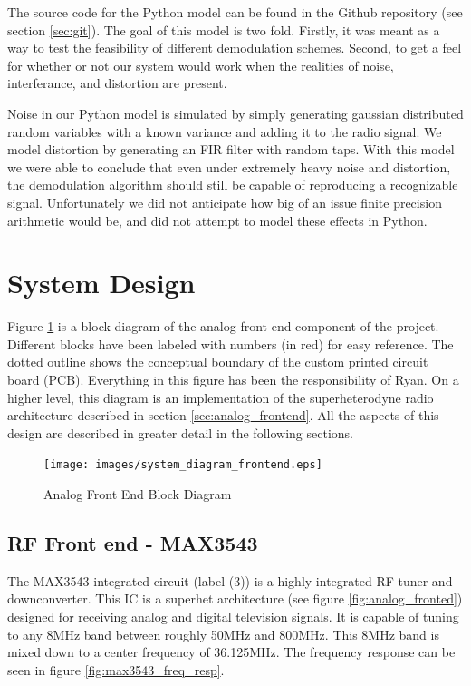 \documentclass[a4paper, 12pt, notitlepage]{article}
\begin{document}
The source code for the Python model can be found in the Github repository (see section \ref{sec:git}).  The goal of this model is two fold.  Firstly, it was meant as a way to test the feasibility of different demodulation schemes.  Second, to get a feel for whether or not our system would work when the realities of noise, interferance, and distortion are present.

Noise in our Python model is simulated by simply generating gaussian distributed random variables with a known variance and adding it to the radio signal.  We model distortion by generating an FIR filter with random taps.  With this model we were able to conclude that even under extremely heavy noise and distortion, the demodulation algorithm should still be capable of reproducing a recognizable signal.  Unfortunately we did not anticipate how big of an issue finite precision arithmetic would be, and did not attempt to model these effects in Python.

\section{System Design}
Figure \ref{fig:analog_block_diagram} is a block diagram of the analog front end component of the project.  Different blocks have been labeled with numbers (in red) for easy reference.  The dotted outline shows the conceptual boundary of the custom printed circuit board (PCB).  Everything in this figure has been the responsibility of Ryan.  On a higher level, this diagram is an implementation of the superheterodyne radio architecture described in section \ref{sec:analog_frontend}.  All the aspects of this design are described in greater detail in the following sections.

\begin{figure}
  \centering
  \caption{Analog Front End Block Diagram}
  \label{fig:analog_block_diagram}
  \texttt{[image: images/system\_diagram\_frontend.eps]}
\end{figure}

\subsection{RF Front end - MAX3543}
The MAX3543 integrated circuit \cite{max3543} (label (3)) is a highly integrated RF tuner and downconverter.  This IC is a superhet architecture (see figure \ref{fig:analog_fronted}) designed for receiving analog and digital television signals.  It is capable of tuning to any 8MHz band between roughly 50MHz and 800MHz.  This 8MHz band is mixed down to a center frequency of 36.125MHz.  The frequency response can be seen in figure \ref{fig:max3543_freq_resp}.
\end{document}
